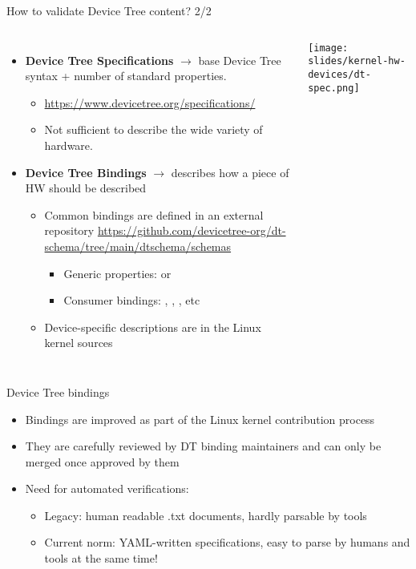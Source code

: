 \begin{frame}[fragile]{How to validate Device Tree content? 2/2}
  \begin{columns}
    \begin{itemize}
    \item {\bf Device Tree Specifications} $\rightarrow$ base Device
      Tree syntax + number of standard properties.
      \begin{itemize}
      \item \url{https://www.devicetree.org/specifications/}
      \item Not sufficient to describe the wide variety of hardware.
      \end{itemize}
    \item {\bf Device Tree Bindings} $\rightarrow$ describes how a piece
      of HW should be described
      \begin{itemize}
      \item Common bindings are defined in an external repository
        \url{https://github.com/devicetree-org/dt-schema/tree/main/dtschema/schemas}
        \begin{itemize}
        \item Generic properties:  or
          {}
        \item Consumer bindings: , ,
          , etc
        \end{itemize}
      \item Device-specific descriptions are in the Linux kernel sources
      \end{itemize}
    \end{itemize}
    \texttt{[image: slides/kernel-hw-devices/dt-spec.png]}
  \end{columns}
\end{frame}

\begin{frame}{Device Tree bindings}
  \begin{itemize}
      \item Bindings are improved as part of the Linux kernel
        contribution process
      \item They are carefully reviewed by DT binding maintainers and
        can only be merged once approved by them
      \item Need for automated verifications:
        \begin{itemize}
        \item Legacy: human readable .txt documents, hardly parsable
          by tools
        \item Current norm: YAML-written specifications, easy to parse
          by humans and tools at the same time!
        \end{itemize}
    \end{itemize}
\end{frame}

